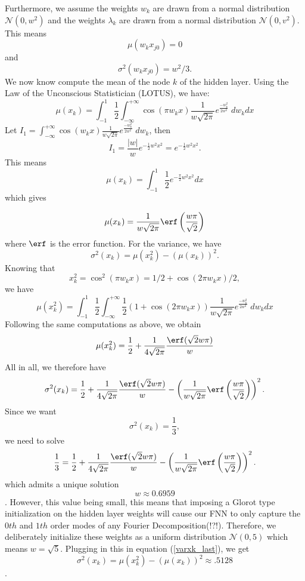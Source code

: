 \documentclass[AMS,STIX1COL]{WileyNJD-v2}
\begin{document}
Furthermore, we assume the weights $w_k$ are drawn from a normal distribution $\mathcal N(0, w^2)$ and the weights $\lambda_k$ are drawn from a normal distribution $\mathcal N(0, v^2)$. This means $$\mu(w_k x_{j0}) = 0$$ and $$\sigma^2(w_k x_{j0}) = w^2/3.$$
We now know compute the mean of the node $k$ of the hidden layer. Using the Law of the Unconscious Statistician (LOTUS), we have:
\begin{equation}\label{muxk}
    \mu(x_k) = \int_{-1}^{1}\frac{1}{2} \int_{-\infty}^{+\infty} \cos(\pi w_k x)\frac{1}{w \sqrt{2\pi}} e^{\frac{-w_k^2}{2w^2}}\; dw_k dx 
\end{equation}
Let $I_1 = \int_{-\infty}^{+\infty} \cos(w_k x)\frac{1}{w \sqrt{2\pi}} e^{\frac{-w_k^2}{2w^2}}\; dw_k$, then
$$I_1 = \frac{|w|}{w}e^{-\frac{1}{2}w^2x^2} = e^{-\frac{1}{2}w^2x^2}. $$
This means
$$ \mu(x_k) = \int_{-1}^{1}\frac{1}{2} e^{-\frac{\pi}{2}w^2x^2} dx $$
which gives

\begin{equation}\label{muxk_last}
    \mu(x_k) = \frac{1}{w\sqrt{2\pi}}\erf\left(\frac{w\pi}{\sqrt{2}}\right) 
\end{equation}
where $\erf$ is the error function.
For the variance, we have $$\sigma^2(x_k) = \mu(x_k^2) - (\mu(x_k))^2.$$ Knowing that $$x_k^2 = \cos^2(\pi w_k x) = 1/2 + \cos(2\pi w_kx)/2,$$ we have
\begin{equation*}
    \mu(x_k^2) = \int_{-1}^{1}\frac{1}{2} \int_{-\infty}^{+\infty} \frac{1}{2}(1 + \cos(2 \pi w_k x))\frac{1}{w \sqrt{2\pi}} e^{\frac{-w_k^2}{2w^2}}\; dw_k dx
\end{equation*}
Following the same computations as above, we obtain 
$$\mu(x_k^2) = \frac{1}{2} + \frac{1}{4\sqrt{2\pi}}\frac{\erf(\sqrt{2}w\pi)}{w}$$ All in all, we therefore have
\begin{equation}\label{varxk_last}
    \sigma^2(x_k) = \frac{1}{2} + \frac{1}{4\sqrt{2\pi}}\frac{\erf(\sqrt{2}w\pi)}{w}-\left(\frac{1}{w\sqrt{2\pi}}\erf\left(\frac{w\pi}{\sqrt{2}}\right) \right)^2 .
\end{equation}
Since we want $$\sigma^2(x_k) = \frac{1}{3}, $$ we need to solve 
\begin{equation*}
    \frac{1}{3} = \frac{1}{2} + \frac{1}{4\sqrt{2\pi}}\frac{\erf(\sqrt{2}w\pi)}{w}-\left(\frac{1}{w\sqrt{2\pi}}\erf\left(\frac{w\pi}{\sqrt{2}}\right) \right)^2 .
\end{equation*}
which admits a unique solution $$w \approx 0.6959$$. However, this value being small, this means that imposing a Glorot type initialization on the hidden layer weights will cause our FNN to only capture the $0th$ and $1th$ order modes of any Fourier Decomposition(!?!). Therefore, we deliberately initialize these weights as a uniform distribution $\mathcal N(0,5)$ which means $w = \sqrt{5}$.  Plugging in this in equation (\ref{varxk_last}), we get
$$\sigma^2(x_k) = \mu(x_k^2) - (\mu(x_k))^2 \approx .5128$$. 
\end{document}

